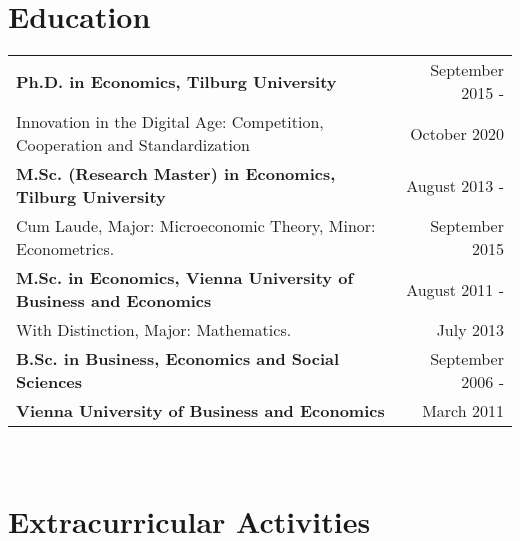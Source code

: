 \documentclass[a4paper,9pt]{article}
\begin{document}
\section{Education}

\begin{tabular}{p{15cm} r}
  \textbf{Ph.D. in Economics, Tilburg University} &September 2015 -\\
  Innovation in the Digital Age: Competition, Cooperation and Standardization & October 2020\hphantom{-}\vspace{0.5em}\\
  \textbf{M.Sc. (Research Master) in Economics, Tilburg University}&  August 2013 -\\
  Cum Laude, Major: Microeconomic Theory, Minor: Econometrics.& September 2015\hphantom{-}
  \vspace{0.5em}\\
  \textbf{M.Sc. in Economics, Vienna University of Business and Economics}& August 2011 -\\
  With Distinction, Major: Mathematics. & July 2013\phantom{-}
  \vspace{0.5em}\\
  \textbf{B.Sc. in Business, Economics and Social Sciences}& September 2006 -\\
  \textbf{Vienna University of Business and Economics}& March 2011\phantom{- }\\
\end{tabular}\\

\section{Extracurricular Activities }
\end{document}
